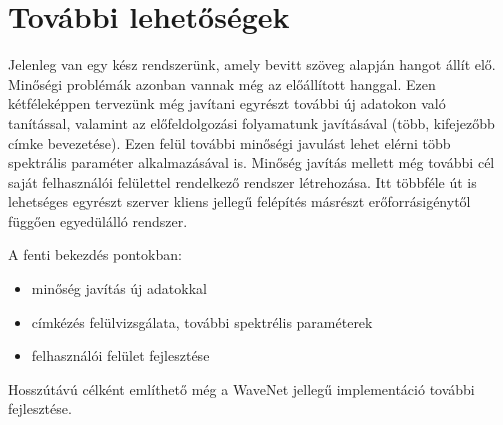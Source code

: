 \section{További lehetőségek}

Jelenleg van egy kész rendszerünk, amely bevitt szöveg alapján hangot állít elő. Minőségi problémák azonban vannak még az előállított hanggal. Ezen kétféleképpen tervezünk még javítani egyrészt további új adatokon való tanítással, valamint az előfeldolgozási folyamatunk javításával (több, kifejezőbb címke bevezetése). Ezen felül további minőségi javulást lehet elérni több spektrális paraméter alkalmazásával is. Minőség javítás mellett még további cél saját felhasználói felülettel rendelkező rendszer létrehozása. Itt többféle út is lehetséges egyrészt szerver kliens jellegű felépítés másrészt erőforrásigénytől függően egyedülálló rendszer. 

A fenti bekezdés pontokban:

\begin{itemize}
	\item minőség javítás új adatokkal
	\item címkézés felülvizsgálata, további spektrélis paraméterek
	\item felhasználói felület fejlesztése
\end{itemize}

Hosszútávú célként említhető még a WaveNet jellegű implementáció további fejlesztése.
